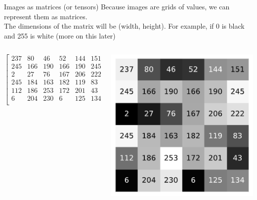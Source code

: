 \documentclass[9pt, aspectratio=169]{beamer}
\begin{document}
\begin{frame}
    {Images as matrices (or tensors)}
    Because images are grids of values, we can represent them as matrices.\\

    The dimensions of the matrix will be (width, height).
    For example, if 0 is black and 255 is white (more on this later)

    \begin{columns}
        \begin{column}{0.5\textwidth}
            $$
                \begin{bmatrix}
                    237 & 80  & 46  & 52  & 144 & 151 \\
                    245 & 166 & 190 & 166 & 190 & 245 \\
                    2   & 27  & 76  & 167 & 206 & 222 \\
                    245 & 184 & 163 & 182 & 119 & 83  \\
                    112 & 186 & 253 & 172 & 201 & 43  \\
                    6   & 204 & 230 & 6   & 125 & 134 \\
                \end{bmatrix}
            $$
        \end{column}

        \begin{column}{0.45\textwidth}
            \includegraphics[width=.8\textwidth]{rasterexample.png}
        \end{column}
    \end{columns}
\end{frame}
\end{document}
